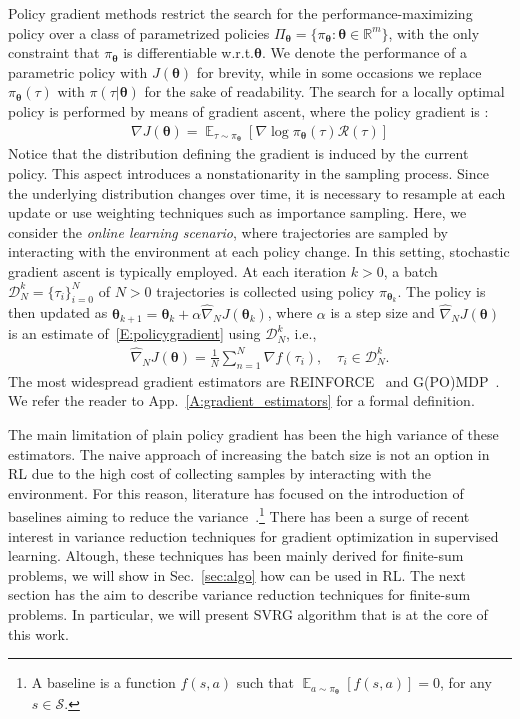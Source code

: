 \documentclass{article}
\makeatletter
\theoremstyle{remark}
\theoremstyle{definition}
\DeclareRobustCommand{\eg}{e.g.,\@\xspace}
\DeclareRobustCommand{\ie}{i.e.,\@\xspace}
\DeclareRobustCommand{\wrt}{w.r.t.\@\xspace}
\newcommand{\todopirout}[1]{\todo[color=blued]{\scriptsize #1}}
\newcommand{\realspace}{\mathbb R}      %
\DeclareMathOperator*{\EV}{\mathbb{E}}
\newcommand{\EVV}[2][\ppvect \in \ppspace]{\EV_{#1}\left[{#2}\right]}
\newcommand{\de}{\,\mathrm{d}}
\newcommand{\vtheta}{\boldsymbol{\theta}}
\newcommand{\Sspace}{\mathcal{S}}
\newcommand{\Tspace}{\mathcal{T}}
\newcommand{\Reward}{\mathcal{R}}
\newcommand{\pol}{\pi_{\vtheta}}
\newcommand{\score}[2]{\nabla\log\pi_{#1}(#2)}
\newcommand{\gradJ}[1]{\nabla J(#1)}
\newcommand{\gradApp}[2]{\widehat{\nabla}_{#2}J(#1)}
\makeatother
\begin{document}
Policy gradient methods restrict the search for the performance-maximizing policy over a class of parametrized policies $\Pi_{\vtheta}=\{\pol: \vtheta \in \realspace^m\}$, with the only constraint that $\pol$ is differentiable \wrt $\vtheta$. We denote the performance of a parametric policy with $J(\vtheta)$ for brevity, while in some occasions we replace $\pol(\tau)$ with $\pi(\tau|\vtheta)$ for the sake of readability.\todopirout{See if it used}
The search for a locally optimal policy is performed by means of gradient ascent, where the policy gradient
is \cite{sutton2000policy, Peters2008reinf}:
\begin{align} \label{E:policygradient}
        \gradJ{\vtheta} = \EVV[\tau \sim \pol]{\score{\vtheta}{\tau}\Reward(\tau)}
\end{align}
Notice that the distribution defining the gradient is induced by the current policy. This aspect introduces a nonstationarity in the sampling process. Since the underlying distribution changes over time, it is necessary to resample at each update or use weighting techniques such as importance sampling.
Here, we consider the \emph{online learning scenario}, where trajectories are sampled by interacting with the environment at each policy change. 
In this setting, stochastic gradient ascent is typically employed.
At each iteration $k >0$, a batch $\mathcal{D}_N^k = \{\tau_i\}_{i=0}^N$ of $N>0$ trajectories is collected using policy $\pi_{\vtheta_k}$.
The policy is then updated as $\vtheta_{k+1}  = \vtheta_k + \alpha\gradApp{\vtheta_k}{N}$, where $\alpha$ is a step size and $\gradApp{\vtheta}{N}$ is an estimate of~\eqref{E:policygradient} using $\mathcal{D}_N^k$, \ie
\begin{align} \label{E:policygradient.estimate}
        \gradApp{\vtheta}{N} = \frac{1}{N}\sum_{n=1}^{N} \nabla f(\tau_i), \quad \tau_i \in \mathcal{D}_N^k.
\end{align}
The most widespread gradient estimators are REINFORCE~\citep{williams1992simple} and G(PO)MDP~\citep{baxter2001infinite}.
We refer the reader to App.~\ref{A:gradient_estimators} for a formal definition.

The main limitation of plain policy gradient has been the high variance of these estimators.
The naive approach of increasing the batch size is not an option in RL due to the high cost of collecting samples by interacting with the environment.
For this reason, literature has focused on the introduction of baselines aiming to reduce the variance~\citep[\eg][]{Peters2008reinf,Thomas2017actionbaseline,wu2018variance}.\footnote{A baseline is a function $f(s,a)$ such that $\EVV[a \sim \pol]{f(s,a)} = 0$, for any $s\in\Sspace$.}
There has been a surge of recent interest in variance reduction techniques for gradient optimization in supervised learning.
Altough, these techniques has been mainly derived for finite-sum problems, we will show in Sec.~\ref{sec:algo} how can be used in RL.
The next section has the aim to describe variance reduction techniques for finite-sum problems. In particular, we will present SVRG algorithm that is at the core of this work.
\end{document}

